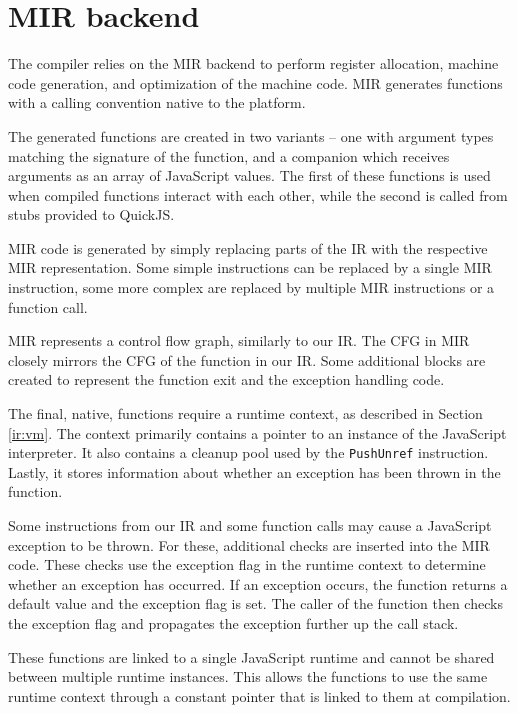 \pagebreak
\section{MIR backend}

The compiler relies on the MIR backend to perform register allocation, machine code generation, and optimization of the machine code. MIR generates functions with a calling convention native to the platform.

The generated functions are created in two variants -- one with argument types matching the signature of the function, and a companion which receives arguments as an array of JavaScript values. The first of these functions is used when compiled functions interact with each other, while the second is called from stubs provided to QuickJS.

MIR code is generated by simply replacing parts of the IR with the respective MIR representation. Some simple instructions can be replaced by a single MIR instruction, some more complex are replaced by multiple MIR instructions or a function call.

MIR represents a control flow graph, similarly to our IR. The CFG in MIR closely mirrors the CFG of the function in our IR. Some additional blocks are created to represent the function exit and the exception handling code.

The final, native, functions require a runtime context, as described in Section \ref{ir:vm}. The context primarily contains a pointer to an instance of the JavaScript interpreter. It also contains a cleanup pool used by the \texttt{PushUnref} instruction. Lastly, it stores information about whether an exception has been thrown in the function.

Some instructions from our IR and some function calls may cause a JavaScript exception to be thrown. For these, additional checks are inserted into the MIR code. These checks use the exception flag in the runtime context to determine whether an exception has occurred. If an exception occurs, the function returns a default value and the exception flag is set. The caller of the function then checks the exception flag and propagates the exception further up the call stack.

These functions are linked to a single JavaScript runtime and cannot be shared between multiple runtime instances. This allows the functions to use the same runtime context through a constant pointer that is linked to them at compilation.


